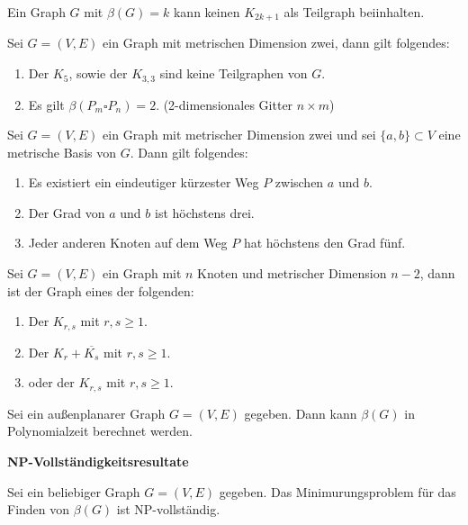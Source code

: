 \begin{lem}
Ein Graph $G$ mit $\beta(G) = k$ kann keinen $K_{2k+1}$ als Teilgraph beiinhalten.\cite{landmarks}
\end{lem}
\begin{lem}
Sei $G = (V, E)$ ein Graph mit metrischen Dimension zwei, dann gilt folgendes:\cite{landmarks}
\begin{enumerate}
\item Der $K_{5}$, sowie der $K_{3,3}$ sind keine Teilgraphen von $G$.
\item Es gilt $\beta(P_m \square P_n)=2$. (2-dimensionales Gitter $n \times m$)
\end{enumerate}
\end{lem}

\begin{lem}
Sei $G = (V, E)$ ein Graph mit metrischer Dimension zwei und sei $\{a, b\} \subset V$ eine metrische Basis von $G$. Dann gilt folgendes:\cite{landmarks}
\begin{enumerate}
\item Es existiert ein eindeutiger kürzester Weg $P$ zwischen $a$ und $b$.
\item Der Grad von $a$ und $b$ ist höchstens drei.
\item Jeder anderen Knoten auf dem Weg $P$ hat höchstens den Grad fünf.
\end{enumerate}
\end{lem}
\begin{lem}
Sei $G = (V, E)$ ein Graph mit $n$ Knoten und metrischer Dimension $n-2$, dann ist der Graph eines der folgenden:\cite{landmarks}
\begin{enumerate}
\item Der $K_{r,s}$ mit $r,s \geq 1$.
\item Der $K_{r}+ \overline{K_s}$ mit $r,s \geq 1$.
\item oder der $K_{r,s}$ mit $r,s \geq 1$.
\end{enumerate}
\end{lem}
\begin{lem}
Sei ein außenplanarer Graph $G=(V,E)$ gegeben. Dann kann $\beta(G)$ in Polynomialzeit berechnet werden.\cite{onthecomplexity}
\end{lem}
\textbf{NP-Vollständigkeitsresultate}
\begin{lem}
Sei ein beliebiger Graph $G=(V,E)$ gegeben. Das Minimurungsproblem für das Finden von $\beta(G)$ ist NP-vollständig.\cite{onthecomplexity}
\end{lem}

